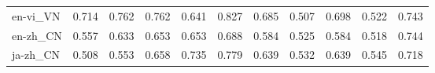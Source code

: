 \begin{tabular}{lllllllllll}
en-vi\_VN & \cellcolor[HTML]{45AD5B}\textcolor[HTML]{000000}{0.714} & \cellcolor[HTML]{1E9A51}\textcolor[HTML]{FFFFFF}{0.762} & \cellcolor[HTML]{1E9A51}\textcolor[HTML]{FFFFFF}{0.762} & \cellcolor[HTML]{7DC765}\textcolor[HTML]{000000}{0.641} & \cellcolor[HTML]{097940}\textcolor[HTML]{FFFFFF}{0.827} & \cellcolor[HTML]{5DB961}\textcolor[HTML]{000000}{0.685} & \cellcolor[HTML]{CDEA83}\textcolor[HTML]{000000}{0.507} & \cellcolor[HTML]{51B35E}\textcolor[HTML]{000000}{0.698} & \cellcolor[HTML]{C5E67E}\textcolor[HTML]{000000}{0.522} & \cellcolor[HTML]{2DA155}\textcolor[HTML]{FFFFFF}{0.743} \\
en-zh\_CN & \cellcolor[HTML]{B1DE71}\textcolor[HTML]{000000}{0.557} & \cellcolor[HTML]{82C966}\textcolor[HTML]{000000}{0.633} & \cellcolor[HTML]{73C264}\textcolor[HTML]{000000}{0.653} & \cellcolor[HTML]{73C264}\textcolor[HTML]{000000}{0.653} & \cellcolor[HTML]{5AB760}\textcolor[HTML]{000000}{0.688} & \cellcolor[HTML]{A2D76A}\textcolor[HTML]{000000}{0.584} & \cellcolor[HTML]{C3E67D}\textcolor[HTML]{000000}{0.525} & \cellcolor[HTML]{A2D76A}\textcolor[HTML]{000000}{0.584} & \cellcolor[HTML]{C7E77F}\textcolor[HTML]{000000}{0.518} & \cellcolor[HTML]{2DA155}\textcolor[HTML]{FFFFFF}{0.744} \\
ja-zh\_CN & \cellcolor[HTML]{CBE982}\textcolor[HTML]{000000}{0.508} & \cellcolor[HTML]{B3DF72}\textcolor[HTML]{000000}{0.553} & \cellcolor[HTML]{70C164}\textcolor[HTML]{000000}{0.658} & \cellcolor[HTML]{33A456}\textcolor[HTML]{FFFFFF}{0.735} & \cellcolor[HTML]{16914D}\textcolor[HTML]{FFFFFF}{0.779} & \cellcolor[HTML]{7DC765}\textcolor[HTML]{000000}{0.639} & \cellcolor[HTML]{BFE47A}\textcolor[HTML]{000000}{0.532} & \cellcolor[HTML]{7DC765}\textcolor[HTML]{000000}{0.639} & \cellcolor[HTML]{B9E176}\textcolor[HTML]{000000}{0.545} & \cellcolor[HTML]{42AC5A}\textcolor[HTML]{000000}{0.718} \\
\bottomrule
\end{tabular}

